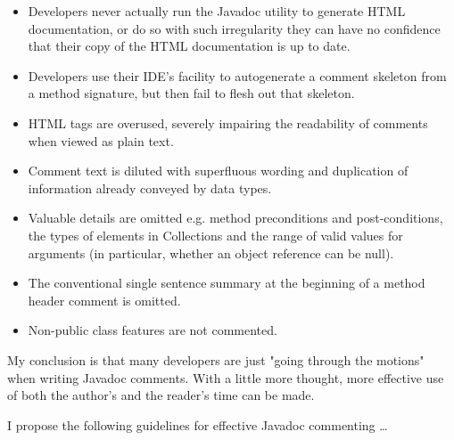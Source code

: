 \documentclass{article}
\begin{document}
\begin{itemize}
\item Developers never actually run the Javadoc utility to generate HTML
documentation, or do so with such irregularity they can have no
confidence that their copy of the HTML documentation is up to date.\\
\item Developers use their IDE's facility to autogenerate a comment
skeleton from a method signature, but then fail to flesh out that
skeleton.\\
\item HTML tags are overused, severely impairing the readability of
comments when viewed as plain text.\\
\item Comment text is diluted with superfluous wording and duplication of
information already conveyed by data types.\\
\item Valuable details are omitted e.g. method preconditions and
post-conditions, the types of elements in Collections and the range
of valid values for arguments (in particular, whether an object
reference can be null).\\
\item The conventional single sentence summary at the beginning of a method
header comment is omitted.\\
\item Non-public class features are not commented.
\end{itemize}

My conclusion is that many developers are just "going through the
motions" when writing Javadoc comments. With a little more thought, more
effective use of both the author's and the reader's time can be made.

I propose the following guidelines for effective Javadoc commenting \ldots{}
\end{document}
